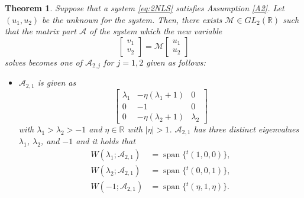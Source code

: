\documentclass[11pt,a4paper,twosides]{amsart}
\theoremstyle{plain}
\newtheorem{theorem}{Theorem}[section]
\theoremstyle{remark}
\numberwithin{equation}{section}
\newcommand{\R}{\mathbb{R}}
\DeclareMathOperator{\Span}{span}
\theoremstyle{definition}
\newcommand{\1}{{\bf 1}_{\{|x| < |t|\}}}
\begin{document}
\begin{theorem}\label{thm:standard2}
Suppose that a system \eqref{eq:2NLS} satisfies Assumption \ref{A2}. Let $(u_1,u_2)$ be the unknown for the system.
Then, there exists $\mathscr{M} \in GL_2(\R)$ such that the matrix part $\mathscr{A}$ 
of the system which the new variable
\[
	\begin{bmatrix}
	v_1 \\ v_2
	\end{bmatrix}
	= \mathscr{M}
	\begin{bmatrix}
	u_1 \\ u_2
	\end{bmatrix}
\]
solves becomes one of $\mathscr{A}_{2,j}$ for $j=1,2$ given as follows:
\begin{itemize}
\item $\mathscr{A}_{2,1}$ is given as
\[
	\begin{bmatrix}
	\lambda_1 & 
	-\eta(\lambda_1+1) 
	& 0 \\
	0 & -1& 0\\
	0 & -\eta(\lambda_2+1)  & \lambda_2
	\end{bmatrix}
\]
with $\lambda_1 > \lambda_2 >-1$ and $\eta\in \R$ with $|\eta|>1$.
$\mathscr{A}_{2,1}$ has three distinct eigenvalues 
$\lambda_1$, $\lambda_2$, and $-1$ and it holds that
\begin{align*}
	W(\lambda_1;\mathscr{A}_{2,1}) 
	&= \Span \{{}^t\!(1,0,0) \}, \\
	W(\lambda_2;\mathscr{A}_{2,1}) 
	&= \Span \{{}^t\!(0,0,1) \},\\
	W(-1;\mathscr{A}_{2,1}) 
	&= \Span \{{}^t\!(\eta,1,\eta) \}.
\end{align*}

\end{itemize}
\end{theorem}
\end{document}
